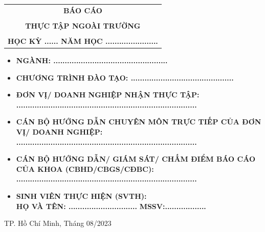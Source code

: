 \documentclass[a4paper]{article}
\theoremstyle{definition}
\begin{document}
\begin{titlepage}
\begin{center}
\begin{tabular}{c}
\multicolumn{1}{c}{\textbf{{\LARGE BÁO CÁO}}}\\
\\{\textbf{{\LARGE THỰC TẬP NGOÀI TRƯỜNG}}}
\\
\\
\textbf{\Large HỌC KỲ ...... NĂM HỌC .......................} \\
\end{tabular}
\end{center}
\vspace{0.5cm}
\begin{itemize}
\renewcommand\labelitemi{--}
    \item \Large \textbf{NGÀNH: ..................................................}
    \item \Large \textbf{CHƯƠNG TRÌNH ĐÀO TẠO: .............................................}
\end{itemize}
\vspace{0.7cm}
\begin{itemize}
\renewcommand\labelitemi{--}
    \item \Large \textbf{ĐƠN VỊ/ DOANH NGHIỆP NHẬN THỰC TẬP:} 
    \\ \Large \textbf{...............................................................................}
    \item \Large \textbf{CÁN BỘ HƯỚNG DẪN CHUYÊN MÔN TRỰC TIẾP CỦA ĐƠN VỊ/ DOANH NGHIỆP:}
    \\ \Large \textbf{...............................................................................}
    \item \Large \textbf{CÁN BỘ HƯỚNG DẪN/ GIÁM SÁT/ CHẤM ĐIỂM BÁO CÁO CỦA KHOA (CBHD/CBGS/CĐBC):} 
    \\ \Large \textbf{...............................................................................}
    \item \Large \textbf{SINH VIÊN THỰC HIỆN (SVTH):}
    \\ \Large \textbf{HỌ VÀ TÊN: ..............................} \textbf{MSSV:..................}
\end{itemize}
\vspace{0.5cm}
\begin{center}
{\Large TP. Hồ Chí Minh, Tháng 08/2023}
\end{center}
\end{titlepage}


\end{document}
